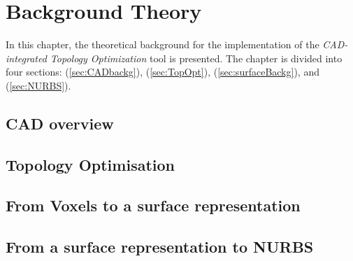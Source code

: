 \chapter{Background Theory}
In this chapter, the theoretical background for the implementation of the \textit{CAD-integrated Topology Optimization} tool is presented. The chapter is divided into four sections: \emph{} (\autoref{sec:CADbackg}), \emph{} (\autoref{sec:TopOpt}), \emph{} (\autoref{sec:surfaceBackg}), and \emph{} (\autoref{sec:NURBS}).
\label{chapter:Background}

\section{CAD overview}
\label{sec:CADbackg}


\section{Topology Optimisation}
\label{sec:TopOpt}


%

\section{From Voxels to a surface representation}
\label{sec:surfaceBackg}


\section{From a surface representation to NURBS}
\label{sec:NURBS}



